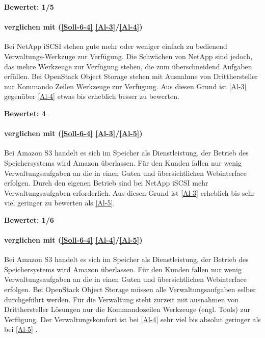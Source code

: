 \textbf{Bewertet: 1/5}


\paragraph*{  verglichen mit  (\ref{Soll-6-4} \ref{Al-3}/\ref{Al-4})}
Bei NetApp iSCSI stehen gute mehr oder weniger einfach zu bedienend Verwaltungs-Werkzuge zur Verfügung. Die Schwächen von NetApp sind jedoch, das mehre Werkzeuge zur Verfügung stehen, die zum überschneidend Aufgaben erfüllen. Bei OpenStack Object Storage stehen mit Ausnahme von Dritthersteller nur Kommando Zeilen Werkzeuge zur Verfügung. 
Aus diesen Grund ist  \ref{Al-3} gegenüber  \ref{Al-4} etwas bis erheblich besser zu bewerten.
 
\textbf{Bewertet: 4}


\paragraph*{  verglichen mit  (\ref{Soll-6-4} \ref{Al-3}/\ref{Al-5})}
Bei Amazon S3 handelt es sich im Speicher als Dienstleistung, der Betrieb des Speichersystems wird Amazon überlassen. Für den Kunden fallen nur wenig Verwaltungsaufgaben an die in einen Guten und übersichtlichen Webinterface erfolgen. Durch den eigenen Betrieb sind bei NetApp iSCSI mehr Verwaltungsaufgaben erforderlich. Aus diesen Grund ist  \ref{Al-3} erheblich bis sehr viel geringer zu bewerten als  \ref{Al-5}.

\textbf{Bewertet: 1/6}


\paragraph*{  verglichen mit  (\ref{Soll-6-4} \ref{Al-4}/\ref{Al-5})}
Bei Amazon S3 handelt es sich im Speicher als Dienstleistung, der Betrieb des Speichersystems wird Amazon überlassen. Für den Kunden fallen nur wenig Verwaltungsaufgaben an die in einen Guten und übersichtlichen Webinterface erfolgen. Bei OpenStack Object Storage müssen alle Verwaltungsaufgaben selber durchgeführt werden. Für die Verwaltung steht zurzeit mit ausnahmen von Dritthersteller Lösungen nur die Kommandozeilen Werkzeuge (engl. Tools) zur Verfügung. Der Verwaltungskomfort ist bei  \ref{Al-4} sehr viel bis absolut geringer als bei \ref{Al-5} .

